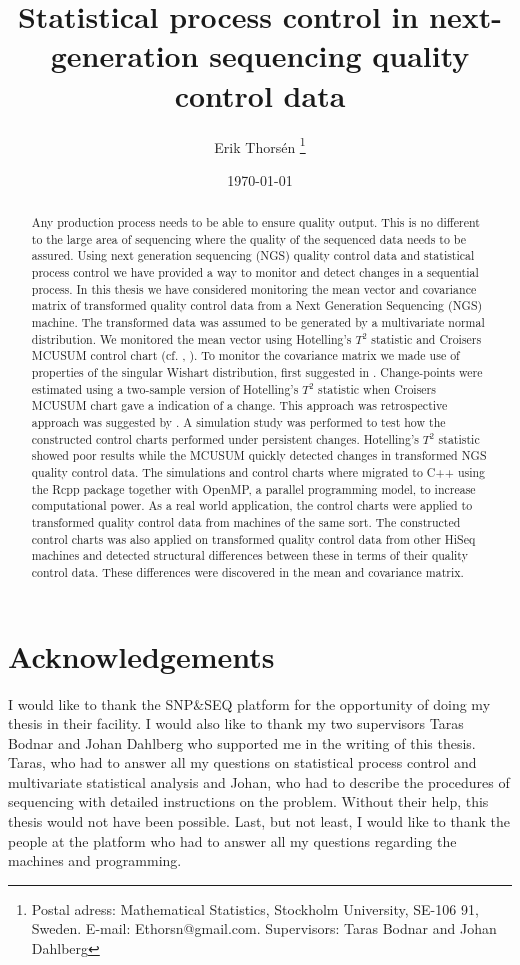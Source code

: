 \documentclass[a4paper,11pt,fleqn,twoside,notitlepage]{report}\usepackage[]{graphicx}\usepackage[]{color}
\title{Statistical process control in next-generation sequencing quality control data}
\author{Erik Thors\'{e}n \thanks{Postal adress: Mathematical Statistics, Stockholm University, SE-106 91, Sweden. E-mail: Ethorsn@gmail.com. Supervisors: Taras Bodnar and Johan Dahlberg}}
\date{\today}
\begin{document}
\maketitle

\begin{center}
\begin{abstract}
Any production process needs to be able to ensure quality output. This is no different to the large area of sequencing where the quality of the sequenced data needs to be assured. Using next generation sequencing (NGS) quality control data and statistical process control we have provided a way to monitor and detect changes in a sequential process. In this thesis we have considered monitoring the mean vector and covariance matrix of transformed quality control data from a Next Generation Sequencing (NGS) machine. The transformed data was assumed to be generated by a multivariate normal distribution. We monitored the mean vector using Hotelling's $T^2$ statistic and Croisers MCUSUM control chart (cf. \citet{HotellingQC}, \citet{Croiser1988}). To monitor the covariance matrix we made use of properties of the singular Wishart distribution, first suggested in \citet{Bodnar2009}. Change-points were estimated using a two-sample version of Hotelling's $T^2$ statistic when Croisers MCUSUM chart gave a indication of a change. This approach was retrospective approach was suggested by \citet{pignatiello2001estimation}. A simulation study was performed to test how the constructed control charts performed under persistent changes. Hotelling's $T^2$ statistic showed poor results while the MCUSUM quickly detected changes in transformed NGS quality control data. The simulations and control charts where migrated to C++ using the Rcpp package together with OpenMP, a parallel programming model, to increase computational power. As a real world application, the control charts were applied to transformed quality control data from machines of the same sort. The constructed control charts was also applied on transformed quality control data from other HiSeq machines and detected structural differences between these in terms of their quality control data. These differences were discovered in the mean and covariance matrix.    

\end{abstract}
\end{center}
\newpage
\section*{Acknowledgements}
I would like to thank the SNP\&SEQ platform for the opportunity of doing my thesis in their facility. I would also like to thank my two supervisors Taras Bodnar and Johan Dahlberg who supported me in the writing of this thesis. Taras, who had to answer all my questions on statistical process control and multivariate statistical analysis and Johan, who had to describe the procedures of sequencing with detailed instructions on the problem. Without their help, this thesis would not have been possible. Last, but not least, I would like to thank the people at the platform who had to answer all my questions regarding the machines and programming. 
\newpage
\tableofcontents
\end{document}
